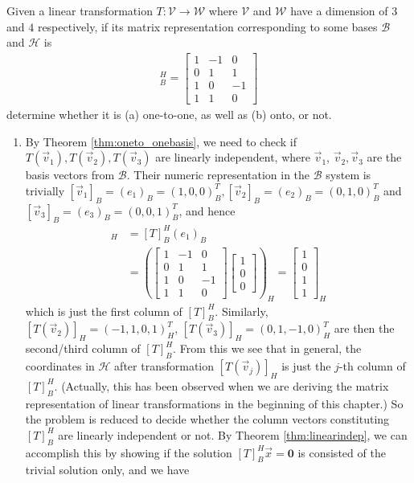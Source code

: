 \begin{exmp}
Given a linear transformation $T: \mathcal{V} \to \mathcal{W}$ where $\mathcal{V}$ and $\mathcal{W}$ have a dimension of $3$ and $4$ respectively, if its matrix representation corresponding to some bases $\mathcal{B}$ and $\mathcal{H}$ is
\begin{align*}
[T]_B^H =
\begin{bmatrix}
1 & -1 & 0 \\
0 & 1 & 1 \\
1 & 0 & -1 \\
1 & 1 & 0
\end{bmatrix}
\end{align*}
determine whether it is (a) one-to-one, as well as (b) onto, or not.
\end{exmp}
\begin{solution}
\begin{enumerate}[label=(\alph*)]
    \item By Theorem \ref{thm:oneto_onebasis}, we need to check if $T(\vec{v}_1), T(\vec{v}_2), T(\vec{v}_3)$ are linearly independent, where $\vec{v}_1$, $\vec{v}_2, \vec{v}_3$ are the basis vectors from $\mathcal{B}$. Their numeric representation in the $\mathcal{B}$ system is trivially $[\vec{v}_1]_B = (e_1)_B = (1,0,0)_B^T, [\vec{v}_2]_B = (e_2)_B = (0,1,0)_B^T$ and $[\vec{v}_3]_B = (e_3)_B = (0,0,1)_B^T$, and hence
    \begin{align*}
    [T(\vec{v}_1)]_H &= [T]_B^H(e_1)_B \\
    &= 
    \left(\begin{bmatrix}
    1 & -1 & 0 \\
    0 & 1 & 1 \\
    1 & 0 & -1 \\
    1 & 1 & 0
    \end{bmatrix}
    \begin{bmatrix}
    1 \\
    0 \\
    0
    \end{bmatrix}\right)_H = 
    \begin{bmatrix}
    1 \\
    0 \\
    1 \\
    1
    \end{bmatrix}_H
    \end{align*}
    which is just the first column of $[T]_B^H$. Similarly, $[T(\vec{v}_2)]_H = (-1,1,0,1)_H^T$, $[T(\vec{v}_3)]_H = (0,1,-1,0)_H^T$ are then the second/third column of $[T]_B^H$. From this we see that in general, the coordinates in $\mathcal{H}$ after transformation $[T(\vec{v}_j)]_H$ is just the $j$-th column of $[T]_B^H$. (Actually, this has been observed when we are deriving the matrix representation of linear transformations in the beginning of this chapter.) So the problem is reduced to decide whether the column vectors constituting $[T]_B^H$ are linearly independent or not. By Theorem \ref{thm:linearindep}, we can accomplish this by showing if the solution $[T]_B^H\vec{x} = \textbf{0}$ is consisted of the trivial solution only, and we have

\end{enumerate}
\end{solution}
